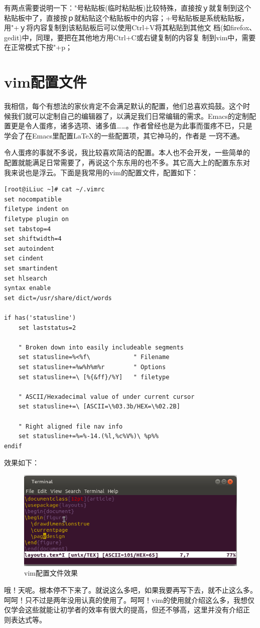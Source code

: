 有两点需要说明一下："号粘贴板(临时粘贴板)比较特殊，直接按ｙ就复制到这个
粘贴板中了，直接按ｐ就粘贴这个粘贴板中的内容；+号粘贴板是系统粘贴板，
用"+ｙ将内容复制到该粘贴板后可以使用Ctrl+V将其粘贴到其他文
档(如firefox、gedit)中，同理，要把在其他地方用Ctrl+C或右键复制的内容复
制到vim中，需要在正常模式下按"+p；

\section{vim配置文件}

我相信，每个有想法的家伙肯定不会满足默认的配置，他们总喜欢捣鼓。这个时
候我们就可以定制自己的编辑器了，以满足我们日常编辑的需求。Emacs的定制配
置更是令人蛋疼，诸多选项、诸多值……。作者曾经也是为此事而蛋疼不已，只是
学会了在Emacs里配置\LaTeX\index{\LaTeX}的一些配置项，其它神马的，作者是
一窍不通。

令人蛋疼的事就不多说，我比较喜欢简洁的配置。本人也不会开发，一些简单的
配置就能满足日常需要了，再说这个东东用的也不多。其它高大上的配置东东对
我来说也是浮云。下面是我常用的vim的配置文件，配置如下：

\begin{verbatim}
[root@iLiuc ~]# cat ~/.vimrc
set nocompatible
filetype indent on
filetype plugin on
set tabstop=4
set shiftwidth=4
set autoindent
set cindent
set smartindent
set hlsearch
syntax enable
set dict=/usr/share/dict/words

if has('statusline')
    set laststatus=2

    " Broken down into easily includeable segments
    set statusline=%<%f\            " Filename
    set statusline+=%w%h%m%r        " Options
    set statusline+=\ [%{&ff}/%Y]   " filetype

    " ASCII/Hexadecimal value of under current cursor
    set statusline+=\ [ASCII=\%03.3b/HEX=\%02.2B]

    " Right aligned file nav info
    set statusline+=%=%-14.(%l,%c%V%)\ %p%%
endif
\end{verbatim}

效果如下：

\begin{figure}[htbp]
  \centering
  \includegraphics[width=.75\textwidth]{graph/vimrc.png}
  \caption{vim配置文件效果}
  \label{fig:vimConf}
\end{figure}

哦！天呢。根本停不下来了。就说这么多吧，如果我要再写下去，就不止这么多。
呵呵！只不过是两年没用认真的使用了。呵呵！vim的使用就介绍这么多，我想仅
仅学会这些就能让初学者的效率有很大的提高，但还不够高，这里并没有介绍正
则表达式等。
